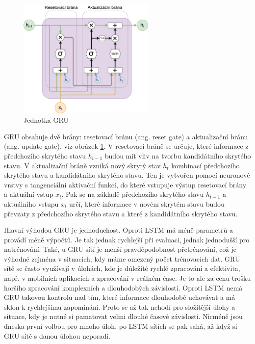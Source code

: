 \begin{figure}
    \centering
    \includegraphics[width=0.6\textwidth]{Figures/GRU_unit.pdf}
    \caption{Jednotka GRU}
    \label{fig:gru_unit}
\end{figure}

GRU obsahuje dvě brány: resetovací bránu (ang. reset gate) a aktualizační bránu
(ang. update gate), viz obrázek \ref{fig:gru_unit}. V resetovací bráně se
určuje, které informace z předchozího skrytého stavu $h_{t-1}$ budou mít vliv
na tvorbu kandidátního skrytého stavu. V aktualizační bráně vzniká nový skrytý
stav $h_t$ kombinací předchozího skrytého stavu a kandidátního skrytého stavu.
Ten je vytvořen pomocí neuronové vrstvy s tangenciální aktivační funkcí, do
které vstupuje výstup resetovací brány a aktuální vstup $x_t$. Pak se na
základě předchozího skrytého stavu $h_{t-1}$ a aktuálního vstupu $x_t$ určí,
které informace v novém skrytém stavu budou převzaty z předchozího skrytého
stavu a které z kandidátního skrytého stavu.

Hlavní výhodou GRU je jednoduchost. Oproti LSTM má méně parametrů a provádí
méně výpočtů. Je tak jednak rychlejší při evaluaci, jednak jednodušší pro
natrénování. Také, u GRU sítí je menší pravděpodobnost přetrénování, což je
výhodné zejména v situacích, kdy máme omezený počet trénovacích dat. GRU sítě
se často využívají v úlohách, kde je důležité rychlé zpracování a efektivita,
např. v mobilních aplikacích a zpracování v reálném čase. Je to ale za cenu
trošku horšího zpracování komplexních a dlouhodobých závislostí. Oproti LSTM
nemá GRU takovou kontrolu nad tím, které informace dlouhodobě uchovávat a má
sklon k rychlejšímu zapomínání. Proto se až tak nehodí pro složitější úlohy a
situace, kdy je nutné si pamatovat velmi dlouhé časové závislosti. Nicméně jsou
dneska první volbou pro mnoho úloh, po LSTM sítích se pak sahá, až když si GRU
sítě s danou úlohou neporadí.

\endinput